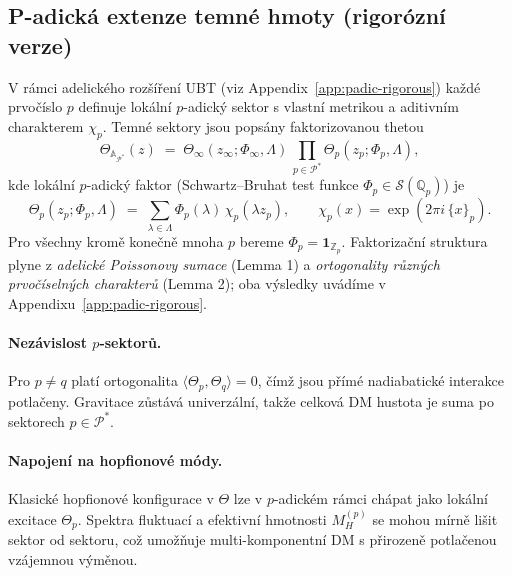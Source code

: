 \documentclass[12pt,a4paper]{article}
\numberwithin{equation}{section}
\theoremstyle{definition}
\theoremstyle{remark}
\begin{document}
\subsection{P-adická extenze temné hmoty (rigorózní verze)}
V rámci adelického rozšíření UBT (viz Appendix~\ref{app:padic-rigorous}) každé prvočíslo $p$ definuje lokální $p$-adický sektor
s vlastní metrikou a aditivním charakterem $\chi_p$. Temné sektory jsou popsány faktorizovanou thetou
\begin{equation}
\Theta_{\mathbb{A}_{\mathcal{P}^\ast}}(z) \;=\; \Theta_\infty(z_\infty;\Phi_\infty,\Lambda)\,\prod_{p\in\mathcal{P}^\ast}\Theta_p(z_p;\Phi_p,\Lambda),
\end{equation}
kde lokální $p$-adický faktor (Schwartz--Bruhat test funkce $\Phi_p\in\mathcal{S}(\mathbb{Q}_p)$) je
\begin{equation}
\Theta_p(z_p;\Phi_p,\Lambda) \;=\; \sum_{\lambda\in\Lambda} \Phi_p(\lambda)\,\chi_p(\lambda z_p),\qquad
\chi_p(x)=\exp(2\pi i\,\{x\}_p).
\end{equation}
Pro všechny kromě konečně mnoha $p$ bereme $\Phi_p=\mathbf{1}_{\mathbb{Z}_p}$. Faktorizační struktura plyne z \emph{adelické Poissonovy sumace} (Lemma 1)
a \emph{ortogonality různých prvočíselných charakterů} (Lemma 2); oba výsledky uvádíme v Appendixu~\ref{app:padic-rigorous}.

\paragraph{Nezávislost $p$-sektorů.}
Pro $p\neq q$ platí ortogonalita $\langle \Theta_p,\Theta_q\rangle=0$, čímž jsou přímé nadiabatic\-ké interakce potlačeny.
Gravitace zůstává univerzální, takže celková DM hustota je suma po sektorech $p\in\mathcal{P}^\ast$.

\paragraph{Napojení na hopfionové módy.}
Klasické hopfionové konfigurace v $\Theta$ lze v $p$-adickém rámci chápat jako lokální excitace $\Theta_p$.
Spektra fluktuací a efektivní hmotnosti $M_H^{(p)}$ se mohou mírně lišit sektor od sektoru, což umožňuje multi-komponentní DM s přirozeně potlačenou vzájemnou výměnou.
\end{document}
